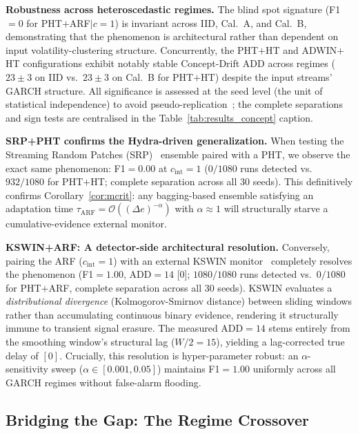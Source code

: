 \documentclass[10pt,conference]{IEEEtran}
\theoremstyle{definition}
\begin{document}
\textbf{Robustness across heteroscedastic regimes.}
The blind spot signature (F1${=}0$ for PHT$+$ARF$|c{=}1$) is invariant across IID, Cal.~A, and Cal.~B, demonstrating that the phenomenon is architectural rather than dependent on input volatility-clustering structure.
Concurrently, the PHT$+$HT and ADWIN$+$HT configurations exhibit notably stable Concept-Drift ADD across regimes ($23 \pm 3$ on IID vs.\ $23 \pm 3$ on Cal.~B for PHT$+$HT) despite the input streams' GARCH structure.
All significance is assessed at the seed level (the unit of statistical independence) to avoid pseudo-replication~\cite{demsar_statistical_2006}; the complete separations and sign tests are centralised in the Table~\ref{tab:results_concept} caption.

\textbf{SRP+PHT confirms the Hydra-driven generalization.}
When testing the Streaming Random Patches (SRP)~\cite{gomes_srp_2019} ensemble paired with a PHT, we observe the exact same phenomenon: F1${=}0.00$ at $c_{\mathrm{int}}=1$ ($0/1080$ runs detected vs.\ $932/1080$ for PHT$+$HT; complete separation across all 30 seeds). This definitively confirms Corollary~\ref{cor:mcrit}: any bagging-based ensemble satisfying an adaptation time $\tau_{\mathrm{ARF}} = \mathcal{O}((\Delta e)^{-\alpha})$ with $\alpha \approx 1$ will structurally starve a cumulative-evidence external monitor.

\textbf{KSWIN+ARF: A detector-side architectural resolution.}
Conversely, pairing the ARF ($c_{\mathrm{int}}=1$) with an external KSWIN monitor~\cite{raab_kswin_2020} completely resolves the phenomenon (F1${=}1.00$, ADD${=}14$ [0]; $1080/1080$ runs detected vs.\ $0/1080$ for PHT$+$ARF, complete separation across all 30 seeds). KSWIN evaluates a \emph{distributional divergence} (Kolmogorov-Smirnov distance) between sliding windows rather than accumulating continuous binary evidence, rendering it structurally immune to transient signal erasure. The measured ADD${=}14$ stems entirely from the smoothing window's structural lag ($W/2=15$), yielding a lag-corrected true delay of $[0]$. Crucially, this resolution is hyper-parameter robust: an $\alpha$-sensitivity sweep ($\alpha \in [0.001, 0.05]$) maintains F1${=}1.00$ uniformly across all GARCH regimes without false-alarm flooding.

\subsection{Bridging the Gap: The Regime Crossover}\label{sec:crossover}
\end{document}
